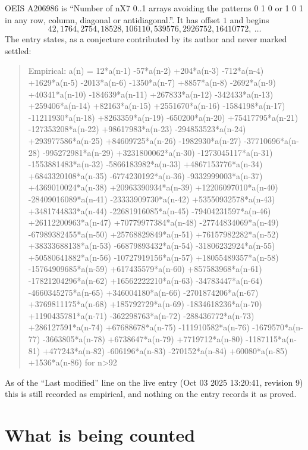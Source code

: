 \documentclass[11pt,a4paper]{article}
\theoremstyle{plain}
\theoremstyle{definition}
\begin{document}
OEIS A206986 is ``Number of nX7 0..1 arrays avoiding the patterns 0 1 0 or 1 0 1 in any row, column, diagonal or antidiagonal.''. It has offset $1$ and begins
\[
42, 1764, 2754, 18528, 106110, 539576, 2926752, 16410772,\ \dots
\]
The entry states, as a conjecture contributed by its author and never marked settled:
\begin{quote}
Empirical: a(n) = 12*a(n-1) -57*a(n-2) +204*a(n-3) -712*a(n-4) +1629*a(n-5) -2013*a(n-6) -1350*a(n-7) +8857*a(n-8) -2692*a(n-9) +40341*a(n-10) -184639*a(n-11) +267833*a(n-12) -342433*a(n-13) +259406*a(n-14) +82163*a(n-15) +2551670*a(n-16) -1584198*a(n-17) -11211930*a(n-18) +8263359*a(n-19) -650200*a(n-20) +75417795*a(n-21) -127353208*a(n-22) +98617983*a(n-23) -294853523*a(n-24) +293977586*a(n-25) +84609725*a(n-26) -1982930*a(n-27) -37710696*a(n-28) -995272981*a(n-29) +3231800062*a(n-30) -1273045117*a(n-31) -1553881483*a(n-32) -5866183982*a(n-33) +4867153776*a(n-34) +6843320108*a(n-35) -6774230192*a(n-36) -9332999003*a(n-37) +4369010024*a(n-38) +20963390934*a(n-39) +12206097010*a(n-40) -28409016089*a(n-41) -23333909730*a(n-42) +53550932578*a(n-43) +3481744833*a(n-44) -22681916085*a(n-45) -79404231597*a(n-46) +26112200963*a(n-47) +70779977384*a(n-48) -27744834069*a(n-49) -67989382455*a(n-50) +25768829849*a(n-51) +76157982282*a(n-52) +38333688138*a(n-53) -66879893432*a(n-54) -31806232924*a(n-55) +50580641882*a(n-56) -10727919156*a(n-57) +18055489357*a(n-58) -15764909685*a(n-59) +617435579*a(n-60) +857583968*a(n-61) -17821204296*a(n-62) +16562222210*a(n-63) -34783447*a(n-64) -4660345275*a(n-65) +346004180*a(n-66) -2701874206*a(n-67) +3769811175*a(n-68) +185792729*a(n-69) -1834618236*a(n-70) +1190435781*a(n-71) -362298763*a(n-72) -288436772*a(n-73) +286127591*a(n-74) +67688678*a(n-75) -111910582*a(n-76) -1679570*a(n-77) -3663805*a(n-78) +6738647*a(n-79) +7719712*a(n-80) -1187115*a(n-81) +477243*a(n-82) -606196*a(n-83) -270152*a(n-84) +60080*a(n-85) +1536*a(n-86) for n>92
\end{quote}
As of the ``Last modified'' line on the live entry (Oct 03 2025 13:20:41, revision 9) this is still
recorded as empirical, and nothing on the entry records it as proved.

\section{What is being counted}
\end{document}
